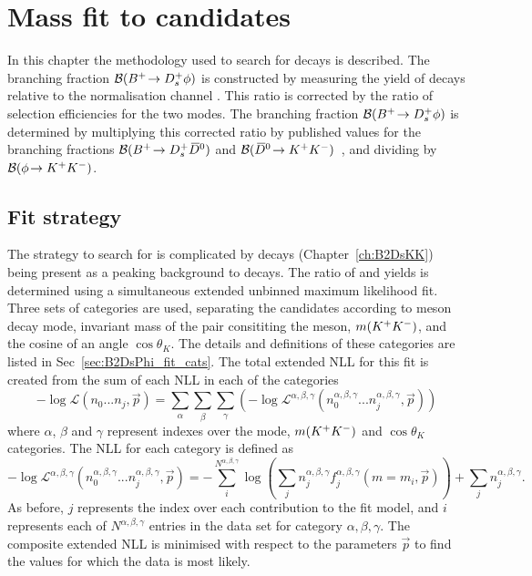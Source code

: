 \chapter{Mass fit to \decay{\Bp}{\Dsp\phiz} candidates} 
\label{ch:B2DsPhi}

\minitoc

In this chapter the methodology used to search for \decay{\Bp}{\Dsp\phiz} decays is described.
The branching fraction ${\mathcal{B}}({{{B}^+}}\!\rightarrow {\ensuremath{{D}^+_{s}}}\phi)$ is constructed by measuring the yield of \decay{\Bp}{\Dsp\phiz} decays relative to the normalisation channel \decay{\Bp}{\Dsp\Dzb}. This ratio is corrected by the ratio of selection efficiencies for the two modes. 
The branching fraction ${\mathcal{B}}({{{B}^+}}\!\rightarrow {\ensuremath{{D}^+_{s}}}\phi)$ is determined by multiplying this corrected ratio by published values for the branching fractions ${\mathcal{B}}({{{B}^+}}\!\rightarrow {\ensuremath{{D}^+_{s}}}{\ensuremath{{\kern 0.2em\overline{\kern -0.2em D}{}}{}^0}})$ and ${\mathcal{B}}({{\kern 0.2em\overline{\kern -0.2em D}{}}{}^0}\!\rightarrow {\ensuremath{{K}^+}}{\ensuremath{{K}^-}})$~\cite{PDG2016}, and dividing by ${\mathcal{B}}(\phi\!\rightarrow {\ensuremath{{K}^+}}{\ensuremath{{K}^-}})$. 


\section{Fit strategy}
\label{sec:B2DsPhi_fitstrategy}
The strategy to search for \decay{\Bp}{\Dsp\phiz} is complicated by \decay{\Bp}{\Dsp\Kp\Km} decays (Chapter~\ref{ch:B2DsKK}) being present as a peaking background to \decay{\Bp}{\Dsp(\decay{\phiz}{\Kp\Km})} decays.
The ratio of \decay{\Bp}{\Dsp\phiz} and \decay{\Bp}{\Dsp\Dzb} yields is determined using a simultaneous extended unbinned maximum likelihood fit. Three sets of categories are used, separating the candidates according to \Dsp meson decay mode, invariant mass of the \Kp\Km pair consititing the \phiz meson, $m({{K}^+}{{K}^-})$, and the cosine of an angle $\cos\theta_{K}$. The details and definitions of these categories are listed in Sec~\ref{sec:B2DsPhi_fit_cats}. 
The total extended NLL for this fit is created from the sum of each NLL in each of the categories
\begin{equation}
-\log\mathcal{L}(n_{0}...n_{j},\vec{p}) = \sum_{\alpha} \sum_{\beta} \sum_{\gamma} \left(-\log\mathcal{L^{\alpha,\beta,\gamma}}(n_{0}^{\alpha,\beta,\gamma}...n_{j}^{\alpha,\beta,\gamma},\vec{p}) \right)
\end{equation} 
where $\alpha$, $\beta$ and $\gamma$ represent indexes over the \Dsp mode, $m({{K}^+}{{K}^-})$ and $\cos\theta_{K}$ categories.
The NLL for each category is defined as
\begin{equation}
-\log\mathcal{L^{\alpha,\beta,\gamma}}(n_{0}^{\alpha,\beta,\gamma}...n_{j}^{\alpha,\beta,\gamma},\vec{p}) = -\sum_{i}^{N^{\alpha,\beta,\gamma}} \log \left( \sum_{j} n_{j}^{\alpha,\beta,\gamma} f_{j}^{\alpha,\beta,\gamma}(m=m_{i},\vec{p}) \right) + \sum_{j}n_{j}^{\alpha,\beta,\gamma}.
\end{equation} 
As before, $j$ represents the index over each contribution to the fit model, and $i$ represents each of $N^{\alpha,\beta,\gamma}$ entries in the data set for category $\alpha,\beta,\gamma$. 
The composite extended NLL is minimised with respect to the parameters $\vec{p}$ to find the values for which the data is most likely.

